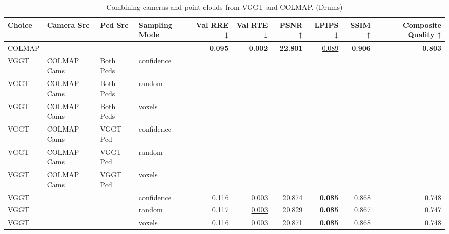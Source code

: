 \begin{table}[H]
\caption{Combining cameras and point clouds from VGGT and COLMAP. (Drums)}
\label{tab:07_combined_single_drums}
\centering
\scriptsize
\begin{tabular}{llllrrrrrr}
\toprule
Choice & Camera Src & Pcd Src & Sampling Mode & Val RRE ↓ & Val RTE ↓ & PSNR ↑ & LPIPS ↓ & SSIM ↑ & Composite Quality ↑ \\
\midrule
COLMAP &  &  &  & \textbf{0.095} & \textbf{0.002} & \textbf{22.801} & \underline{0.089} & \textbf{0.906} & \textbf{0.803} \\
VGGT & COLMAP Cams & Both Pcds & confidence &  &  &  &  &  &  \\
VGGT & COLMAP Cams & Both Pcds & random &  &  &  &  &  &  \\
VGGT & COLMAP Cams & Both Pcds & voxels &  &  &  &  &  &  \\
VGGT & COLMAP Cams & VGGT Pcd & confidence &  &  &  &  &  &  \\
VGGT & COLMAP Cams & VGGT Pcd & random &  &  &  &  &  &  \\
VGGT & COLMAP Cams & VGGT Pcd & voxels &  &  &  &  &  &  \\
VGGT &  &  & confidence & \underline{0.116} & \underline{0.003} & \underline{20.874} & \textbf{0.085} & \underline{0.868} & \underline{0.748} \\
VGGT &  &  & random & 0.117 & \underline{0.003} & 20.829 & \textbf{0.085} & 0.867 & 0.747 \\
VGGT &  &  & voxels & \underline{0.116} & \underline{0.003} & 20.871 & \textbf{0.085} & \underline{0.868} & \underline{0.748} \\
\bottomrule
\end{tabular}
\end{table}
